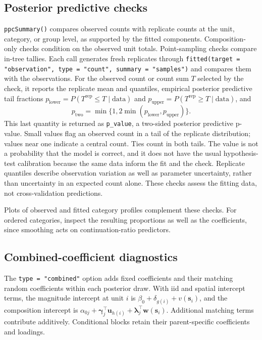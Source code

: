 \documentclass[11pt]{article}
\newcommand{\bgamma}{\bm{\gamma}}
\newcommand{\blambda}{\bm{\lambda}}
\newcommand{\bu}{\bm{u}}
\newcommand{\bw}{\bm{w}}
\newcommand{\bs}{\bm{s}}
\newcommand{\trans}{^\top}
\begin{document}
\subsection{Posterior predictive checks}

\texttt{ppcSummary()} compares observed counts with replicate counts at the
unit, category, or group level, as supported by the fitted components.
Composition-only checks condition on the observed unit totals. Point-sampling
checks compare in-tree tallies. Each call generates fresh replicates through
\texttt{fitted(target = "observation", type = "count", summary = "samples")}
and compares them with the observations. For the observed count or count sum
\(T\) selected by the check, it reports the replicate mean and quantiles,
empirical posterior predictive tail fractions
\(p_{\mathrm{lower}}=P(T^{\mathrm{rep}}\leq T\mid\mathrm{data})\) and
\(p_{\mathrm{upper}}=P(T^{\mathrm{rep}}\geq T\mid\mathrm{data})\), and
\[
p_{\mathrm{two}}=\min\{1,2\min(p_{\mathrm{lower}},p_{\mathrm{upper}})\}.
\]
This last quantity is returned as \texttt{p\_value}, a two-sided posterior
predictive p-value. Small values flag an observed count in a tail of the
replicate distribution; values near one indicate a central count. Ties count
in both tails. The value is not a probability that the model is correct, and
it does not have the usual hypothesis-test calibration because the same data
inform the fit and the check. Replicate quantiles describe observation
variation as well as parameter uncertainty, rather than uncertainty in an
expected count alone. These checks assess the fitting data, not
cross-validation predictions.

Plots of observed and fitted category profiles complement these checks.
For ordered categories, inspect the resulting proportions as well as the
coefficients, since smoothing acts on continuation-ratio predictors.

\subsection{Combined-coefficient diagnostics}
\label{sec:combined-diagnostics}

The \texttt{type = "combined"} option adds fixed coefficients and their
matching random coefficients within each posterior draw. With iid and spatial
intercept terms, the magnitude intercept at unit \(i\) is
\(\beta_0+\delta_{g(i)}+v(\bs_i)\), and the composition intercept is
\(\alpha_{0j}+\bgamma_j\trans\bu_{h(i)}+\blambda_j\trans\bw(\bs_i)\).
Additional matching terms contribute additively. Conditional blocks retain
their parent-specific coefficients and loadings.
\end{document}
